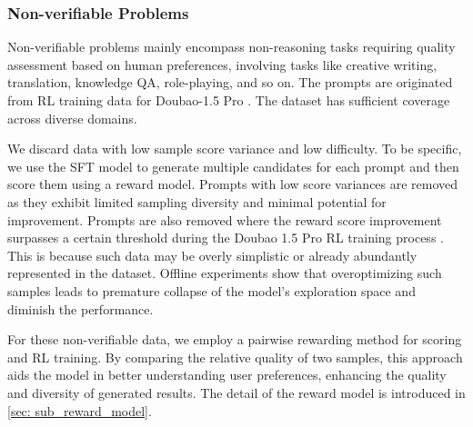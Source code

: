 \subsubsection{Non-verifiable Problems}
Non-verifiable problems mainly encompass non-reasoning tasks requiring quality assessment based on human preferences, involving tasks like creative writing, translation, knowledge QA, role-playing, and so on. The prompts are originated from RL training data for Doubao-1.5 Pro \citep{doubao1.5pro}. The dataset has sufficient coverage across diverse domains. 

We discard data with low sample score variance and low difficulty. To be specific, we use the SFT model to generate multiple candidates for each prompt and then score them using a reward model. Prompts with low score variances are removed as they exhibit limited sampling diversity and minimal potential for improvement. Prompts are also removed where the reward score improvement surpasses a certain threshold during the Doubao 1.5 Pro RL training process \cite{shen2025exploringdatascalingtrends}. This is because such data may be overly simplistic or already abundantly represented in the dataset. Offline experiments show that overoptimizing such samples leads to premature collapse of the model's exploration space and diminish the performance.

For these non-verifiable data, we employ a pairwise rewarding method for scoring and RL training. By comparing the relative quality of two samples, this approach aids the model in better understanding user preferences, enhancing the quality and diversity of generated results. The detail of the reward model is introduced in \ref{sec: sub_reward_model}.





